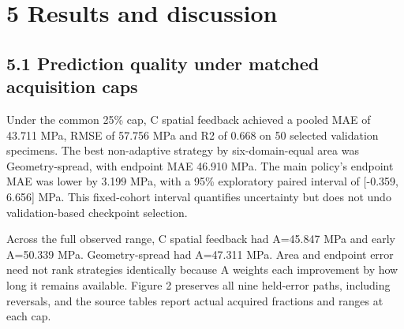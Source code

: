 \hypertarget{results-and-discussion}{%
\section{5 Results and discussion}\label{results-and-discussion}}

\hypertarget{prediction-quality-under-matched-acquisition-caps}{%
\subsection{5.1 Prediction quality under matched acquisition caps}\label{prediction-quality-under-matched-acquisition-caps}}

Under the common 25\% cap, C spatial feedback achieved a pooled MAE of 43.711 MPa, RMSE of 57.756 MPa and R2 of 0.668 on 50 selected validation specimens. The best non-adaptive strategy by six-domain-equal area was Geometry-spread, with endpoint MAE 46.910 MPa. The main policy's endpoint MAE was lower by 3.199 MPa, with a 95\% exploratory paired interval of {[}-0.359, 6.656{]} MPa. This fixed-cohort interval quantifies uncertainty but does not undo validation-based checkpoint selection.

Across the full observed range, C spatial feedback had A=45.847 MPa and early A=50.339 MPa. Geometry-spread had A=47.311 MPa. Area and endpoint error need not rank strategies identically because A weights each improvement by how long it remains available. Figure 2 preserves all nine held-error paths, including reversals, and the source tables report actual acquired fractions and ranges at each cap.

